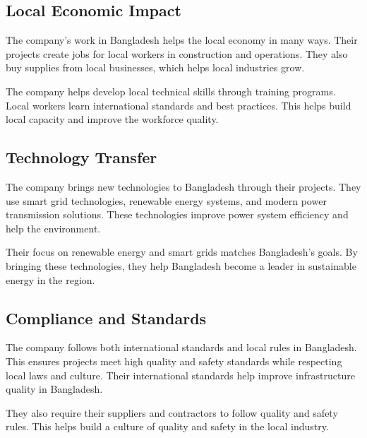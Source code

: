\subsection{Local Economic Impact}
The company's work in Bangladesh helps the local economy in many ways. Their projects create jobs for local workers in construction and operations. They also buy supplies from local businesses, which helps local industries grow.

The company helps develop local technical skills through training programs. Local workers learn international standards and best practices. This helps build local capacity and improve the workforce quality.

\subsection{Technology Transfer}
The company brings new technologies to Bangladesh through their projects. They use smart grid technologies, renewable energy systems, and modern power transmission solutions. These technologies improve power system efficiency and help the environment.

Their focus on renewable energy and smart grids matches Bangladesh's goals. By bringing these technologies, they help Bangladesh become a leader in sustainable energy in the region.

\subsection{Compliance and Standards}
The company follows both international standards and local rules in Bangladesh. This ensures projects meet high quality and safety standards while respecting local laws and culture. Their international standards help improve infrastructure quality in Bangladesh.

They also require their suppliers and contractors to follow quality and safety rules. This helps build a culture of quality and safety in the local industry.


